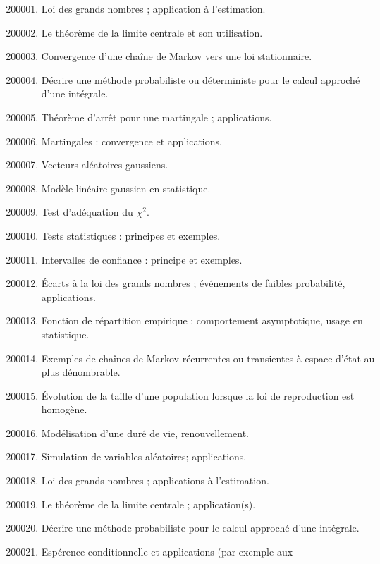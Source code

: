 {{\begin{enumerate}
\setcounter{enumi}{200000}
\item \label{L-00-LGN} Loi des grands nombres ; application à l'estimation.
\item \label{L-00-TCL} Le théorème de la limite centrale et son utilisation.
\item \label{L-00-CCM} Convergence d'une chaîne de Markov vers une loi
  stationnaire.
\item \label{L-00-CAI} Décrire une méthode probabiliste ou déterministe pour
  le calcul approché d'une intégrale.
\item \label{L-00-TAM} Théorème d'arrêt pour une martingale ; applications.
\item \label{L-00-MCA} Martingales : convergence et applications.
\item \label{L-00-VAG} Vecteurs aléatoires gaussiens.
\item \label{L-00-MLG} Modèle linéaire gaussien en statistique.
\item \label{L-00-TAC} Test d'adéquation du $\chi^2$.
\item \label{L-00-TS} Tests statistiques : principes et exemples.
\item \label{L-00-IC} Intervalles de confiance : principe et exemples.
\item \label{L-00-ELG} Écarts à la loi des grands nombres ; événements de
  faibles probabilité, applications.
\item \label{L-00-FRE} Fonction de répartition empirique : comportement
  asymptotique, usage en statistique.
\item \label{L-00-ECM} Exemples de chaînes de Markov récurrentes ou
  transientes à espace d'état au plus dénombrable.
\item \label{L-00-ETP} Évolution de la taille d'une population lorsque la loi
  de reproduction est homogène.
\item \label{L-00-MDV} Modélisation d'une duré de vie, renouvellement.
\item \label{L-00-SVA} Simulation de variables aléatoires; applications.
%
\setcounter{enumi}{200100}
%
\item \label{L-01-1} Loi des grands nombres ; applications à l'estimation.
\item \label{L-01-2} Le théorème de la limite centrale ; application(s).
\item \label{L-01-3} Décrire une méthode probabiliste pour le calcul approché
  d'une intégrale.
\item \label{L-01-4} Espérence conditionnelle et applications (par exemple aux

\end{enumerate}}}
